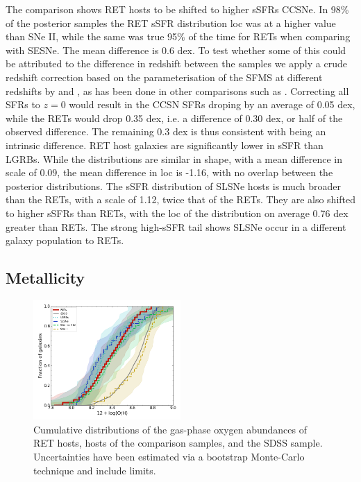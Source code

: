 \documentclass[fleqn,usenatbib,]{mnras}
\newcommand{\phil}[1]{\color{red}#1 \color{black}}
\newcommand{\replychris}[1]{\color{magenta}#1 \color{black}}
\begin{document}
The comparison shows RET hosts to be shifted to higher sSFRs CCSNe. In 98\% of the posterior samples the RET sSFR distribution loc was at a higher value than SNe II, while the same was true 95\% of the time for RETs when comparing with SESNe. \phil{The mean difference is 0.6 dex. To test whether some of this could be attributed to the difference in redshift between the samples we apply a crude redshift correction based on the parameterisation of the SFMS at different redshifts by \citet{Salim2007} and \citet{Noeske2007}, as has been done in other comparisons such as \citet{Taggart2019}. Correcting all SFRs to $z=0$ would result in the CCSN SFRs droping by an average of 0.05 dex, while the RETs would drop 0.35 dex, i.e. a difference of 0.30 dex, or half of the observed difference. The remaining 0.3 dex is thus consistent with being an intrinsic difference.}   
RET host galaxies are significantly lower in sSFR than LGRBs. While the distributions are similar in shape, with a mean difference in scale of 0.09, the mean difference in loc is -1.16, with no overlap between the posterior distributions. The sSFR distribution of SLSNe hosts is much broader than the RETs, with a scale of 1.12, twice that of the RETs. They are also shifted to higher sSFRs than RETs, with the loc of the distribution on average 0.76 dex greater than RETs. The strong high-sSFR tail shows SLSNe \replychris{occur in a different galaxy} population to RETs.

\subsection{Metallicity \label{subsec:res_metallicity}}

\begin{figure}
\includegraphics[width=0.5\textwidth]{figs/RET_OH_cum.png}
\caption{Cumulative distributions of the gas-phase oxygen abundances of RET hosts, hosts of the comparison samples, and the SDSS sample. Uncertainties have been estimated via a bootstrap Monte-Carlo technique and include limits.
\label{fig:oh_cum}}
\end{figure}
\end{document}
